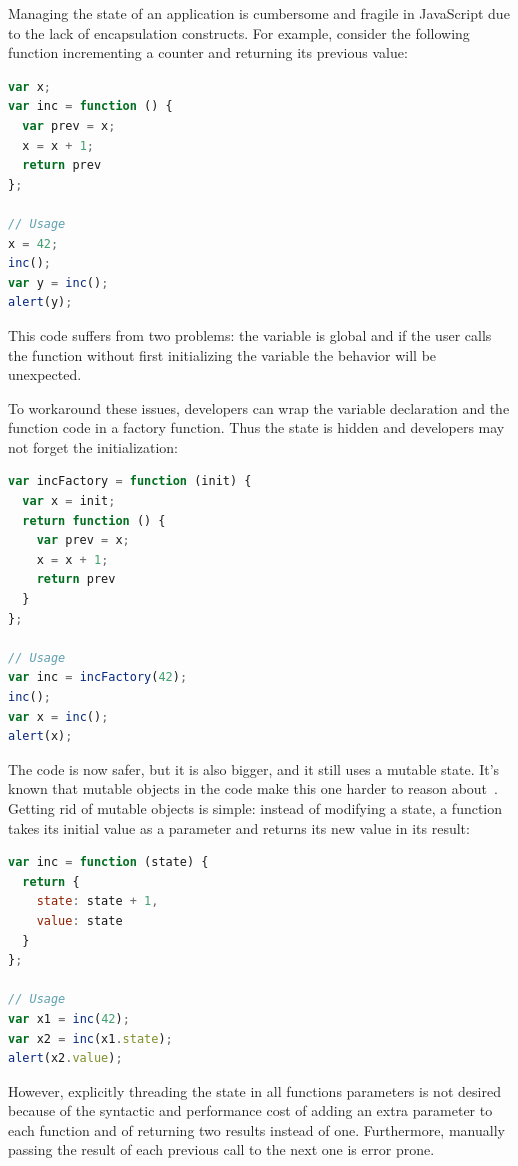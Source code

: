 \documentclass[american,english,runningheads]{llncs}
\begin{document}
Managing the state of an application is cumbersome and fragile in JavaScript due to the lack of encapsulation
constructs. For example, consider the following function incrementing a counter and returning its previous value:
\begin{lstlisting}[language=JavaScript,label=state-fragile,caption=Fragile state handling]
var x;
var inc = function () {
  var prev = x;
  x = x + 1;
  return prev
};

// Usage
x = 42;
inc();
var y = inc();
alert(y);
\end{lstlisting}
This code suffers from two problems: the variable  is global and if the user calls the  function
without first initializing the  variable the behavior will be unexpected.

To workaround these issues, developers can wrap the variable declaration and the  function code in a
factory function. Thus the state is hidden and developers may not forget the initialization:

\begin{lstlisting}[language=JavaScript,label=state-encapsulated,caption=State encapsulation within a function]
var incFactory = function (init) {
  var x = init;
  return function () {
    var prev = x;
    x = x + 1;
    return prev
  }
};

// Usage
var inc = incFactory(42);
inc();
var x = inc();
alert(x);
\end{lstlisting}

The code is now safer, but it is also bigger, and it still uses a mutable state. It’s known that mutable objects in
the code make this one harder to reason about~\cite{Grogono94_Immutability,Kjolstad11_Immutability}. Getting rid of
mutable objects is simple: instead of modifying a state, a function takes its initial value as a parameter and
returns its new value in its result:

\begin{lstlisting}[language=JavaScript,label=state-explicit,caption=Explicit state threading]
var inc = function (state) {
  return {
    state: state + 1,
    value: state
  }
};

// Usage
var x1 = inc(42);
var x2 = inc(x1.state);
alert(x2.value);
\end{lstlisting}

However, explicitly threading the state in all functions parameters is not desired because of the syntactic and
performance cost of adding an extra parameter to each function and of returning two results instead of one.
Furthermore, manually passing the result of each previous call to the next one is error prone.
\end{document}
